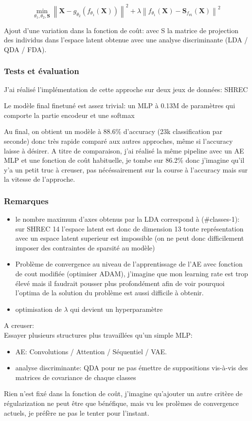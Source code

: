 $$\min _{\theta_{1}, \theta_{2}, \mathbf{S}}\left\|\mathbf{X}-g_{\theta_{2}}\left(f_{\theta_{1}}(\mathbf{X})\right)\right\|^{2}+\lambda\left\|f_{\theta_{1}}(\mathbf{X})-\mathbf{S}_{f_{\theta 1}}(\mathbf{X})\right\|^{2}$$

Ajout d'une variation dans la fonction de coût: avec S la matrice de projection des individus dans l'espace latent obtenue avec une analyse discriminante (LDA / QDA / FDA).

\subsubsection{Tests et évaluation}
J'ai réalisé l'implémentation de cette approche sur deux jeux de données: SHREC

Le modèle final finetuné est assez trivial: un MLP à 0.13M de paramètres  qui comporte la partie encodeur et une softmax 


Au final, on obtient un modèle à 88.6\% d'accuracy (23k classification par seconde) donc très rapide comparé aux autres approches, même si l'accuracy laisse à désirer. A titre de comparaison, j'ai réalisé la même pipeline avec un AE MLP et une fonction de coût habituelle, je tombe sur 86.2\% donc j'imagine qu'il y'a un petit truc à creuser, pas nécéssairement sur la course à l'accuracy mais sur la vitesse de l'approche.

\subsubsection{Remarques}
\begin{itemize}
    \item le nombre maximum d'axes obtenus par la LDA correspond à (\#classes-1): sur SHREC 14 l'espace latent est donc de dimension 13 toute représentation avec un espace latent superieur est impossible (on ne peut donc difficilement imposer des contraintes de sparsité au modèle)
    \item Problème de convergence au niveau de l'apprentissage de l'AE avec fonction de cout modifiée (optimiser ADAM), j'imagine que mon learning rate est trop élevé mais il faudrait pousser plus profondément afin de voir pourquoi l'optima de la solution du problème est aussi difficile à obtenir.
    \item optimisation de $\lambda$ qui devient un hyperparamètre
\end{itemize}

A creuser:\\
Essayer plusieurs structures plus travaillées qu'un simple MLP:
\begin{itemize}
    \item AE: Convolutions / Attention / Séquentiel / VAE.
    \item analyse discriminante: QDA  pour ne pas émettre de suppositions vis-à-vis des matrices de covariance de chaque classes
\end{itemize}

Rien n'est fixé dans la fonction de coût, j'imagine qu'ajouter un autre critère de régularization ne peut être que bénéfique, mais vu les prolèmes de convergence actuels, je préfère ne pas le tenter pour l'instant.

